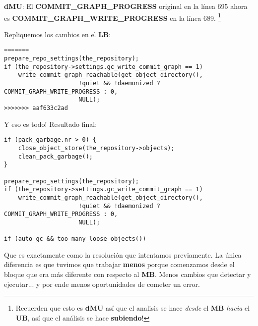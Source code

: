 {\bf dMU}: El {\bf COMMIT\_GRAPH\_PROGRESS} original en la línea 695 ahora es {\bf COMMIT\_GRAPH\_WRITE\_PROGRESS} en la línea 689.
\footnote{Recuerden que esto es {\bf dMU} así que el analisis se hace {\it desde} el {\bf MB} {\it hacia} el {\bf UB}, así que el
análisis se hace {\bf subiendo}!}

Repliquemos los cambios en el {\bf LB}:

\begin{lstlisting}[style=c_style,
	basicstyle=\tiny,
	firstnumber=698,
	caption={\bf Ejemplo 5} - Paso 1]
=======
prepare_repo_settings(the_repository);
if (the_repository->settings.gc_write_commit_graph == 1)
	write_commit_graph_reachable(get_object_directory(),
				     !quiet && !daemonized ? COMMIT_GRAPH_WRITE_PROGRESS : 0,
				     NULL);
>>>>>>> aaf633c2ad
\end{lstlisting}

Y eso es todo! Resultado final:
\begin{lstlisting}[style=c_style,
	basicstyle=\tiny,
	firstnumber=681,
	caption={\bf Ejemplo 5} - Resultado final]
if (pack_garbage.nr > 0) {
	close_object_store(the_repository->objects);
	clean_pack_garbage();
}

prepare_repo_settings(the_repository);
if (the_repository->settings.gc_write_commit_graph == 1)
	write_commit_graph_reachable(get_object_directory(),
				     !quiet && !daemonized ? COMMIT_GRAPH_WRITE_PROGRESS : 0,
				     NULL);

if (auto_gc && too_many_loose_objects())
\end{lstlisting}

Que es exactamente como la resolución que intentamos previamente. La única diferencia es que tuvimos que trabajar {\bf menos}
porque comenzamos desde el bloque que era más diferente con respecto al {\bf MB}. Menos cambios que detectar y ejecutar... y
por ende menos oportunidades de cometer un error.

